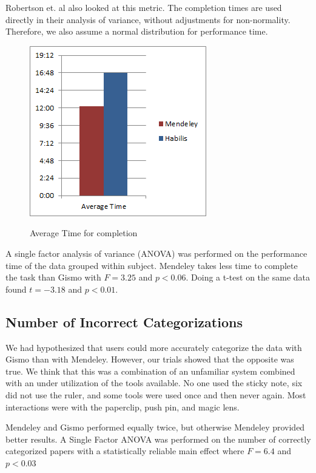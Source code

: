 \documentclass{article}
\begin{document}
Robertson et. al  \cite{Robertson1998} also looked at this metric.  The completion times are used directly in their analysis of variance, without adjustments for non-normality.  Therefore, we also assume a normal distribution for performance time.



\begin{figure}[h!]
\centering
\scalebox{1}
{\includegraphics{AverageTime.png}}
\caption{Average Time for completion}
\label{Fig:timeChart}
\end{figure}


A single factor analysis of variance (ANOVA) was performed on the performance time of the data grouped within subject. Mendeley takes less time to complete the task than Gismo with $F=3.25$ and $p < 0.06$.  Doing a t-test on the same data found $t=-3.18$ and $p<0.01$. 




\subsection*{Number of Incorrect Categorizations}

We had hypothesized that users could more accurately categorize the data with Gismo than with Mendeley.  However, our trials showed that the opposite was true.  We think that this was a combination of an unfamiliar system combined with an under utilization of the tools available.  No one used the sticky note, six did not use the ruler, and some tools were used once and then never again.  Most interactions were with the paperclip, push pin, and magic lens.    

Mendeley and Gismo performed equally twice, but otherwise Mendeley provided better results.  A Single Factor ANOVA was performed on the number of correctly categorized papers with a statistically reliable main effect where $F=6.4$ and $p<0.03$
\end{document}
